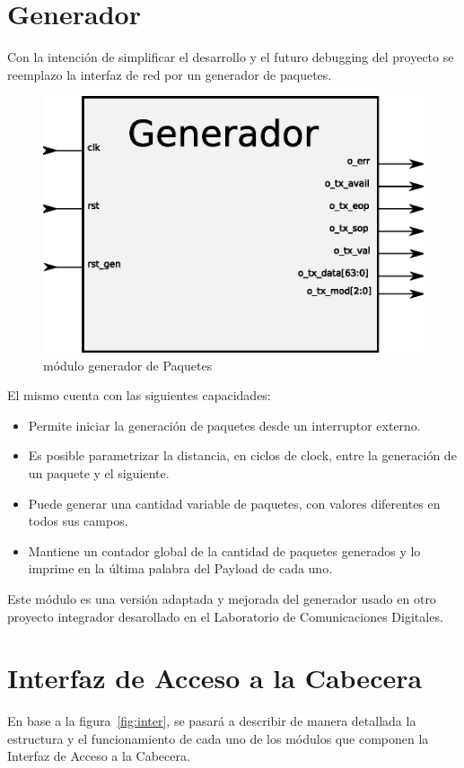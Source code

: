 \section{Generador}

Con la intención de simplificar el desarrollo y el futuro debugging del proyecto se reemplazo la interfaz de red por un generador de paquetes.

\begin{figure}[H]
  \centering
	\includegraphics[scale=0.50]{3-arquitectura/graf/bloqgenerador.eps}
  \caption{módulo generador de Paquetes}
  \label{fig:gen}
\end{figure}


El mismo cuenta con las siguientes capacidades:

\begin{itemize}
	\item Permite iniciar la generación de paquetes desde un interruptor externo.
	\item Es posible parametrizar la distancia, en ciclos de clock, entre la generación de un paquete y el siguiente.
	\item Puede generar una cantidad variable de paquetes, con valores diferentes en todos sus campos.
	\item Mantiene un contador global de la cantidad de paquetes generados y lo imprime en la última palabra del Payload de cada uno.
\end{itemize}

Este módulo es una versión adaptada y mejorada del generador usado en otro proyecto integrador\cite{spaz} desarollado en el Laboratorio de Comunicaciones Digitales.

\section{Interfaz de Acceso a la Cabecera}
En base a la figura~\ref{fig:inter}, se pasará a describir de manera detallada la estructura y el funcionamiento de cada uno de los módulos que componen la Interfaz de Acceso a la Cabecera. 

